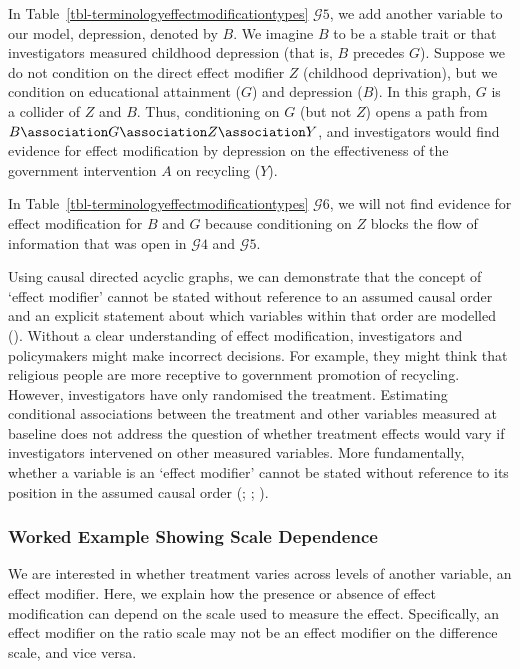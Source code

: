 \documentclass[
  single column]{article}
\begin{document}
In Table~\ref{tbl-terminologyeffectmodificationtypes} \(\mathcal{G}5\),
we add another variable to our model, depression, denoted by \(B\). We
imagine \(B\) to be a stable trait or that investigators measured
childhood depression (that is, \(B\) precedes \(G\)). Suppose we do not
condition on the direct effect modifier \(Z\) (childhood deprivation),
but we condition on educational attainment (\(G\)) and depression
(\(B\)). In this graph, \(G\) is a collider of \(Z\) and \(B\). Thus,
conditioning on \(G\) (but not \(Z\)) opens a path from
\(B \association G \association Z \association Y\), and investigators
would find evidence for effect modification by depression on the
effectiveness of the government intervention \(A\) on recycling (\(Y\)).

In Table~\ref{tbl-terminologyeffectmodificationtypes} \(\mathcal{G}6\),
we will not find evidence for effect modification for \(B\) and \(G\)
because conditioning on \(Z\) blocks the flow of information that was
open in \(\mathcal{G}4\) and \(\mathcal{G}5\).

Using causal directed acyclic graphs, we can demonstrate that the
concept of `effect modifier' cannot be stated without reference to an
assumed causal order and an explicit statement about which variables
within that order are modelled
(). Without a clear
understanding of effect modification, investigators and policymakers
might make incorrect decisions. For example, they might think that
religious people are more receptive to government promotion of
recycling. However, investigators have only randomised the treatment.
Estimating conditional associations between the treatment and other
variables measured at baseline does not address the question of whether
treatment effects would vary if investigators intervened on other
measured variables. More fundamentally, whether a variable is an `effect
modifier' cannot be stated without reference to its position in the
assumed causal order (; ;
).

\subsubsection{Worked Example Showing Scale
Dependence}\label{worked-example-showing-scale-dependence}

We are interested in whether treatment varies across levels of another
variable, an effect modifier. Here, we explain how the presence or
absence of effect modification can depend on the scale used to measure
the effect. Specifically, an effect modifier on the ratio scale may not
be an effect modifier on the difference scale, and vice versa.
\end{document}
